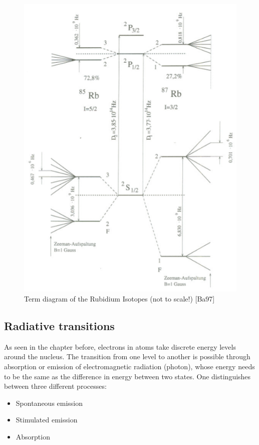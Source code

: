 \begin{figure}[H]
\centering \includegraphics[width = \textwidth]{BilderTheo/RbEnergieLevel.png}
\caption{Term diagram of the Rubidium Isotopes (not to scale!) [Ba97]} 
\label{termschema}
\end{figure}

\subsection{Radiative transitions}

As seen in the chapter before, electrons in atoms take discrete energy levels around the nucleus. The transition from one level to another is possible through absorption or emission of electromagnetic radiation (photon), whose energy needs to be the same as the difference in energy between two states. One distinguishes between three different processes:

\begin{itemize}
\item Spontaneous emission
\item Stimulated emission
\item Absorption
\end{itemize}

